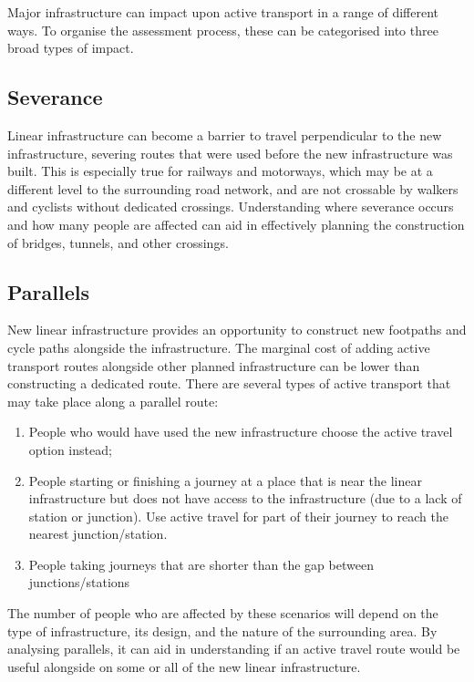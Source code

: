 \documentclass[11pt]{article}
\begin{document}
Major infrastructure can impact upon active transport in a range of
different ways. To organise the assessment process, these can be
categorised into three broad types of impact.

\subsection{Severance}\label{severance}

Linear infrastructure can become a barrier to travel perpendicular to
the new infrastructure, severing routes that were used before the new
infrastructure was built. This is especially true for railways and
motorways, which may be at a different level to the surrounding road
network, and are not crossable by walkers and cyclists without dedicated
crossings. Understanding where severance occurs and how many people are
affected can aid in effectively planning the construction of bridges,
tunnels, and other crossings.

\subsection{Parallels}\label{parallels}

New linear infrastructure provides an opportunity to construct new
footpaths and cycle paths alongside the infrastructure. The marginal
cost of adding active transport routes alongside other planned
infrastructure can be lower than constructing a dedicated route. There
are several types of active transport that may take place along a
parallel route:

\begin{enumerate}
\item
  People who would have used the new infrastructure choose the active
  travel option instead;
\item
  People starting or finishing a journey at a place that is near the
  linear infrastructure but does not have access to the infrastructure
  (due to a lack of station or junction). Use active travel for part of
  their journey to reach the nearest junction/station.
\item
  People taking journeys that are shorter than the gap between
  junctions/stations
\end{enumerate}

The number of people who are affected by these scenarios will depend on
the type of infrastructure, its design, and the nature of the
surrounding area. By analysing parallels, it can aid in understanding if
an active travel route would be useful alongside on some or all of the
new linear infrastructure.
\end{document}
